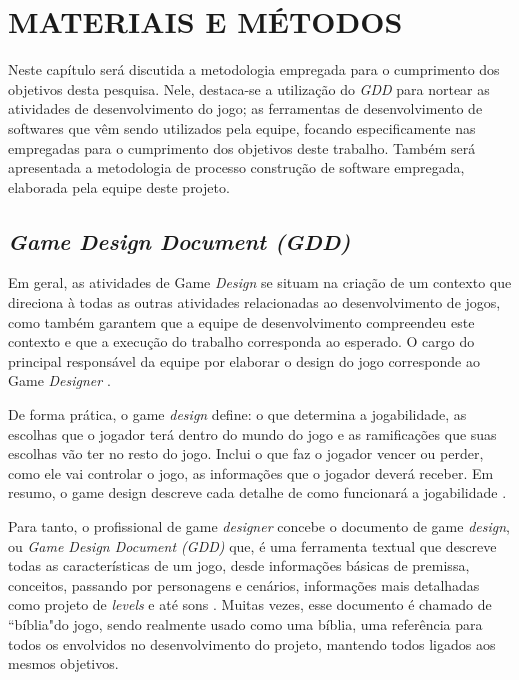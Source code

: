 
\chapter{MATERIAIS E MÉTODOS}
\label{chap:metodologia}

Neste capítulo será discutida a metodologia empregada para o cumprimento dos objetivos desta pesquisa. Nele, destaca-se a utilização do \textit{GDD} para nortear as atividades de desenvolvimento do jogo; as ferramentas de desenvolvimento de softwares que vêm sendo utilizados pela equipe, focando especificamente nas empregadas para o cumprimento dos objetivos deste trabalho. Também será apresentada a metodologia de processo construção de software empregada, elaborada pela equipe deste projeto.

\section{\textit{Game Design Document (GDD)}}
\label{sec:gdd}

Em geral, as atividades de Game \textit{Design} se situam na criação de um contexto que direciona à todas as outras atividades relacionadas ao desenvolvimento de jogos, como também garantem que a equipe de desenvolvimento compreendeu este contexto e que a execução do trabalho corresponda ao esperado. O cargo do principal responsável da equipe por elaborar o design do jogo corresponde ao Game \textit{Designer} \cite{bib:motta2013}.

De forma prática, o game \textit{design} define: o que determina a jogabilidade, as escolhas que o jogador terá dentro do mundo do jogo e as ramificações que suas escolhas vão ter no resto do jogo. Inclui o que faz o jogador vencer ou perder, como ele vai controlar o jogo, as informações que o jogador deverá receber. Em resumo, o game design descreve cada detalhe de como funcionará a jogabilidade \cite{bib:godoi2013}.

Para tanto, o profissional de game \textit{designer} concebe o documento de game \textit{design}, ou \textit{Game Design Document (GDD)} que, é uma ferramenta textual que descreve todas as características de um jogo, desde informações básicas de premissa, conceitos, passando por personagens e cenários, informações mais detalhadas como projeto de \textit{levels} e até sons \cite{bib:motta2013}. Muitas vezes, esse documento é chamado de ``bíblia"\space do jogo, sendo realmente usado como uma bíblia, uma referência para todos os envolvidos no desenvolvimento do projeto, mantendo todos ligados aos mesmos objetivos.

